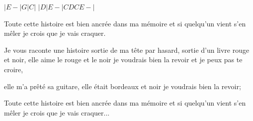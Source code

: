 
\begin{guitar}
$|E-|G|C|$
$|D|E-|C D C E-|$

 Toute cette histoire est bien ancrée dans ma mémoire
et si quelqu'un vient s'en mêler je crois que je vais craquer.

Je vous raconte une histoire sortie de ma tête par hasard,
sortie d'un livre rouge et noir, elle aime le rouge et le noir
je voudrais bien la revoir et je peux pas te croire,

elle m'a prêté sa guitare,
elle était bordeaux et noir je voudrais
bien la revoir;

Toute cette histoire est bien ancrée dans ma mémoire et si quelqu'un vient s'en mêler je crois que je vais craquer... 
\end{guitar}